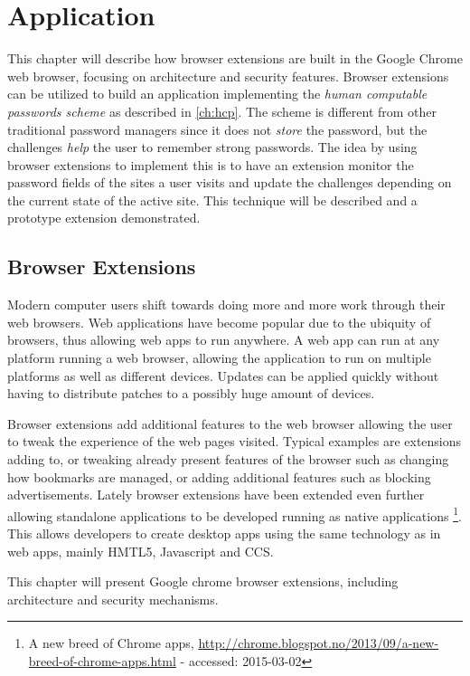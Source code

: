 \chapter{Application}\label{app}
This chapter will describe how browser extensions are built in the Google Chrome web browser, focusing on architecture and security features. Browser extensions can be utilized to build an application implementing the \emph{human computable passwords scheme} as described in \autoref{ch:hcp}. The scheme is different from other traditional password managers since it does not \emph{store} the password, but the challenges \emph{help} the user to remember strong passwords. The idea by using browser extensions to implement this is to have an extension monitor the password fields of the sites a user visits and update the challenges depending on the current state of the active site. This technique will be described and a prototype extension demonstrated. 
\section{Browser Extensions}\label{browser-extensions}
Modern computer users shift towards doing more and more work through their web browsers. Web applications have become popular due to the ubiquity of browsers, thus allowing web apps to run anywhere. A web app can run at any platform running a web browser, allowing the application to run on multiple platforms as well as different devices. Updates can be applied quickly without having to distribute patches to a possibly huge amount of devices.
\par Browser extensions add additional features to the web browser allowing the user to tweak the experience of the web pages visited. Typical examples are extensions adding to, or tweaking already present features of the browser such as changing how bookmarks are managed, or adding additional features such as blocking advertisements. Lately browser extensions have been extended even further allowing standalone applications to be developed running as native applications \footnote{A new breed of Chrome apps, \url{http://chrome.blogspot.no/2013/09/a-new-breed-of-chrome-apps.html} - accessed: 2015-03-02}. This allows developers to create desktop apps using the same technology as in web apps, mainly HMTL5, Javascript and CCS.
\par This chapter will present Google chrome browser extensions, including architecture and security mechanisms.


